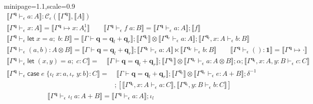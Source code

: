 \documentclass[acmsmall,screen,anonymous,review]{acmart}
\newcommand{\mc}[1]{\ensuremath{\mathcal{#1}}}
\newcommand{\mb}[1]{\ensuremath{\mathbf{#1}}}
\newcommand{\ms}[1]{\ensuremath{\mathsf{#1}}}
\newcommand{\lto}{:}
\newcommand{\linl}[1]{\iota_l\;{#1}}
\newcommand{\linr}[1]{\iota_r\;{#1}}
\newcommand{\letexpr}[3]{\ensuremath{\ms{let}\;#1 = #2;\;#3}}
\newcommand{\caseexpr}[5]{\ms{case}\;#1\;\{\linl{#2} \lto #3, \linr{#4} \lto #5\}}
\newcommand{\qsp}[4]{#1 \vdash #2 = #3 + #4}
\newcommand{\cwk}[2]{#1 \mapsto #2}
\newcommand{\hasty}[4]{#1 \vdash_{#2} #3: {#4}}
\newcommand{\dnt}[1]{\llbracket{#1}\rrbracket}
\newcommand{\oneq}{1}
\begin{document}
\begin{figure}
  \begin{adjustbox}{minipage=1.1\textwidth,scale=0.9}
  \begin{gather*}
    \boxed{\dnt{\hasty{\Gamma^{\mb{q}}}{\epsilon}{a}{A}} 
      : \mc{C}_\epsilon(\dnt{\Gamma^{\mb{q}}}, \dnt{A})} \\
    \dnt{\hasty{\Gamma^{\mb{q}}}{\epsilon}{x}{A}} 
      = \dnt{\cwk{\Gamma^{\mb{q}}}{x : A^\oneq_\epsilon}}
    \qquad
    \dnt{\hasty{\Gamma^{\mb{q}}}{\epsilon}{f\;a}{B}} 
      = \dnt{\hasty{\Gamma^{\mb{q}}}{\epsilon}{a}{A}} ; \dnt{f} \\
    \dnt{\hasty{\Gamma^{\mb{q}}}{\epsilon}{\letexpr{x}{a}{b}}{B}} 
      = \dnt{\qsp{\Gamma}{\mb{q}}{\mb{q}_l}{\mb{q}_r}}
      ; \dnt{\Gamma^{\mb{q}_l}} 
        \otimes \dnt{\hasty{\Gamma^{\mb{q}_r}}{\epsilon}{a}{A}}
      ; \dnt{\hasty{\Gamma^{\mb{q}_l}, x : A}{\epsilon}{b}{B}}
    \\
    \dnt{\hasty{\Gamma^{\mb{q}}}{\epsilon}{(a, b)}{A \otimes B}}
      = \dnt{\qsp{\Gamma}{\mb{q}}{\mb{q}_l}{\mb{q}_r}}
      ; \dnt{\hasty{\Gamma^{\mb{q}_l}}{\epsilon}{a}{A}}
      \ltimes \dnt{\hasty{\Gamma^{\mb{q}_r}}{\epsilon}{b}{B}}
    \qquad
    \dnt{\hasty{\Gamma^{\mb{q}}}{\epsilon}{()}{\mb{1}}}
      = \dnt{\cwk{\Gamma^{\mb{q}}}{\cdot}}
  \end{gather*}
  \begin{align*}
    \dnt{\hasty{\Gamma^{\mb{q}}}{\epsilon}{\letexpr{(x, y)}{a}{c}}{C}}
    = & \; \dnt{\qsp{\Gamma}{\mb{q}}{\mb{q}_l}{\mb{q}_r}}
      ; \dnt{\Gamma^{\mb{q}_l}}
      \otimes \dnt{\hasty{\Gamma^{\mb{q}_r}}{\epsilon}{a}{A \otimes B}}
    ; \alpha
    ; \dnt{\hasty{\Gamma^{\mb{q}_l}, x : A, y : B}{\epsilon}{c}{C}}
  \end{align*}
  \begin{align*}
    \dnt{\hasty{\Gamma^{\mb{q}}}{\epsilon}{\caseexpr{e}{x}{a}{y}{b}}{C}}
    =& \; 
    \dnt{\qsp{\Gamma}{\mb{q}}{\mb{q}_l}{\mb{q}_r}}
    ; \dnt{\Gamma^{\mb{q}_l}} 
    \otimes \dnt{\hasty{\Gamma^{\mb{q}_r}}{\epsilon}{e}{A + B}}
    ; \delta^{-1} \\ & 
    ; [
      \dnt{\hasty{\Gamma^{\mb{q}_l}, x : A}{\epsilon}{a}{C}},
      \dnt{\hasty{\Gamma^{\mb{q}_l}, y : B}{\epsilon}{b}{C}}
    ]
  \end{align*}
  \begin{gather*}
    \dnt{\hasty{\Gamma^{\mb{q}}}{\epsilon}{\linl{a}}{A + B}}
    = \dnt{\hasty{\Gamma^{\mb{q}}}{\epsilon}{a}{A}} ; \iota_l \qquad

\end{gather*}
\end{adjustbox}
\end{figure}
\end{document}
